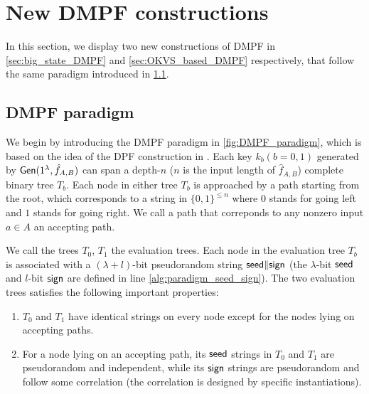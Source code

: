 \section{New DMPF constructions}
In this section, we display two new constructions of DMPF in \cref{sec:big_state_DMPF} and \cref{sec:OKVS_based_DMPF} respectively,  that follow the same paradigm introduced in \cref{sec:DMPF_paradigm}. 

\subsection{DMPF paradigm}\label{sec:DMPF_paradigm}
We begin by introducing the DMPF paradigm in \cref{fig:DMPF_paradigm}, which is based on the idea of the DPF construction in \cite{CCS:BoyGilIsh16}. Each key $k_b(b=0,1)$ generated by ${\sf Gen}(1^\lambda,\hat{f}_{A,B})$ can span a depth-$n$ ($n$ is the input length of $\hat{f}_{A,B}$) complete binary tree $T_b$. Each node in either tree $T_b$ is approached by a path starting from the root, which corresponds to a string in $\{0,1\}^{\le n}$ where $0$ stands for going left and $1$ stands for going right. We call a path that correponds to any nonzero input $a\in A$ an accepting path. 



We call the trees $T_0$, $T_1$ the evaluation trees. Each node in the evaluation tree $T_b$ is associated with a $(\lambda+l)$-bit pseudorandom string ${\sf seed}\|{\sf sign}$ (the $\lambda$-bit ${\sf seed}$ and $l$-bit ${\sf sign}$ are defined in line \ref{alg:paradigm_seed_sign}). The two evaluation trees satisfies the following important properties: 
\begin{enumerate}
  \item\label{enu:tree_invariance_1} $T_0$ and $T_1$ have identical strings on every node except for the nodes lying on accepting paths.
  \item\label{enu:tree_invariance_2} For a node lying on an accepting path, its ${\sf seed}$ strings in $T_0$ and $T_1$ are pseudorandom and independent, while its ${\sf sign}$ strings are pseudorandom and follow some correlation (the correlation is designed by specific instantiations). 
\end{enumerate}  

